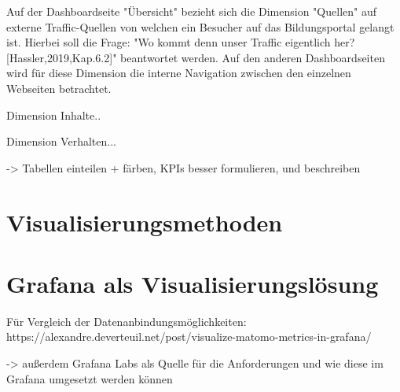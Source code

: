 Auf der Dashboardseite "Übersicht" bezieht sich die Dimension "Quellen" auf externe Traffic-Quellen von welchen ein Besucher auf das Bildungsportal gelangt ist. Hierbei soll die Frage: "Wo kommt denn unser Traffic eigentlich her? [Hassler,2019,Kap.6.2]" beantwortet werden. Auf den anderen Dashboardseiten wird für diese Dimension die interne Navigation zwischen den einzelnen Webseiten betrachtet.

Dimension Inhalte..

Dimension Verhalten...

-> Tabellen einteilen + färben, KPIs besser formulieren, und beschreiben

\section{Visualisierungsmethoden}

\section{Grafana als Visualisierungslösung}
Für Vergleich der Datenanbindungsmöglichkeiten: https://alexandre.deverteuil.net/post/visualize-matomo-metrics-in-grafana/

-> außerdem Grafana Labs als Quelle für die Anforderungen und wie diese im Grafana umgesetzt werden können












